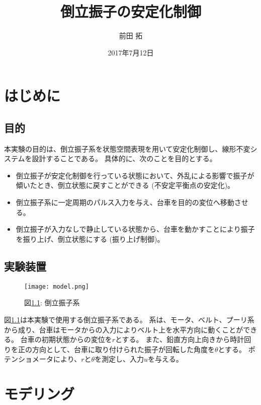 \documentclass[a4j,11pt,twoside]{jbook}
\begin{document}
\title{倒立振子の安定化制御}
\author{前田 拓}
\date{2017年7月12日}
\maketitle

\tableofcontents
\listoffigures
\listoftables
{}

\chapter{はじめに}
\section{目的}
本実験の目的は、倒立振子系を状態空間表現を用いて安定化制御し、線形不変システムを設計することである。
具体的に、次のことを目的とする。
\begin{itemize}
    \item 倒立振子が安定化制御を行っている状態において、外乱による影響で振子が傾いたとき、倒立状態に戻すことができる (不安定平衡点の安定化)。
    \item 倒立振子系に一定周期のパルス入力を与え、台車を目的の変位へ移動させる。
    \item 倒立振子が入力なしで静止している状態から、台車を動かすことにより振子を振り上げ、倒立状態にする (振り上げ制御)。
\end{itemize}
\section{実験装置}
\begin{figure}[htbp]
    \begin{center}
        \texttt{[image: model.png]}
        \caption{図\ref{pendulum}: 倒立振子系}
        \label{pendulum}
    \end{center}
\end{figure}

図\ref{pendulum}は本実験で使用する倒立振子系である。
系は、モータ、ベルト、プーリ系から成り、台車はモータからの入力によりベルト上を水平方向に動くことができる。
台車の初期状態からの変位を$r$とする。
また、鉛直方向上向きから時計回りを正の方向として、台車に取り付けられた振子が回転した角度を$\theta$とする。
ポテンショメータにより、$r$と$\theta$を測定し、入力$u$を与える。

\chapter{モデリング}
\end{document}
